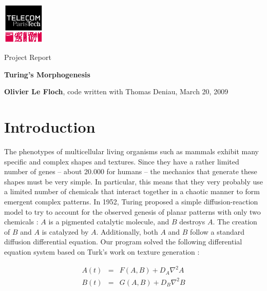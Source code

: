 \documentclass[a4paper,11pt]{article}
\begin{document}
\hskip-2.7cm
  \begin{minipage}[c]{17cm}
  \vskip-2cm
    \begin{minipage}[c]{2cm}
      \includegraphics[width=2cm]{img/logo-telecom-paristech.png}
    \end{minipage}
    \begin{center}
      \vspace*{2cm}

      {\LARGE Project Report}

      {\LARGE \textbf{Turing's Morphogenesis}}

      \vspace*{1cm}

      {\large \textbf{Olivier Le Floch},} code written with Thomas Deniau,
      March 20, 2009
    \end{center}
  \end{minipage}

\section{Introduction}

The phenotypes of multicellular living organisms such as mammals exhibit many
specific and complex shapes and textures. Since they have a rather limited
number of genes -- about 20.000 for humans \cite{human_genome} -- the
mechanics that generate these shapes must be very simple. In particular, this
means that they very probably use a limited number of chemicals that interact
together in a chaotic manner to form emergent complex patterns. In 1952,
Turing \cite{turing} proposed a simple diffusion-reaction model to try to
account for the observed genesis of planar patterns with only two chemicals :
$A$ is a pigmented catalytic molecule, and $B$ destroys $A$. The creation of
$B$ and $A$ is catalyzed by $A$. Additionally, both $A$ and $B$ follow a
standard diffusion differential equation. Our program solved the following
differential equation system based on Turk's \cite{turk} work on texture
generation :

\begin{eqnarray}
  A(t) &=& F(A, B) + D_A \nabla^2 A \\
  B(t) &=& G(A, B) + D_B \nabla^2 B
\end{eqnarray}
\end{document}

